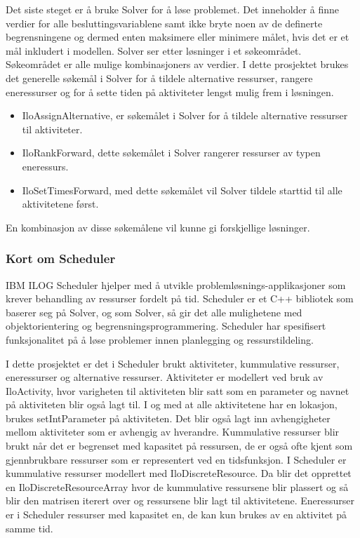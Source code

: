 Det siste steget er å bruke Solver for å løse problemet. Det inneholder å finne verdier for alle besluttingsvariablene samt ikke bryte noen av de definerte begrensningene og dermed enten maksimere eller minimere målet, hvis det er et mål inkludert i modellen. Solver ser etter løsninger i et søkeområdet. Søkeområdet er alle mulige kombinasjoners av verdier. I dette prosjektet brukes det generelle søkemål i Solver for å tildele alternative ressurser, rangere eneressurser og for å sette tiden på aktiviteter lengst mulig frem i løsningen.
\begin{itemize}
\item IloAssignAlternative, er søkemålet i Solver for å tildele alternative ressurser til aktiviteter.
\item IloRankForward, dette søkemålet i Solver rangerer ressurser av typen eneressurs.
\item IloSetTimesForward, med dette søkemålet vil Solver tildele starttid til alle aktivitetene først.
\end{itemize}
En kombinasjon av disse søkemålene vil kunne gi forskjellige løsninger.\cite{cpsolverilog}

\subsubsection{Kort om Scheduler}\cite{cpschedulerilog}
IBM ILOG Scheduler hjelper med å utvikle problemløsnings-applikasjoner som krever behandling av ressurser fordelt på tid. Scheduler er et C++ bibliotek som baserer seg på Solver, og som Solver, så gir det alle mulighetene med objektorientering og begrensningsprogrammering. Scheduler har spesifisert funksjonalitet på å løse problemer innen planlegging og ressurstildeling.

I dette prosjektet er det i Scheduler brukt aktiviteter, kummulative ressurser, eneressurser og alternative ressurser. Aktiviteter er modellert ved bruk av IloActivity, hvor varigheten til aktiviteten blir satt som en parameter og navnet på aktiviteten blir også lagt til. I og med at alle aktivitetene har en lokasjon, brukes setIntParameter på aktiviteten. Det blir også lagt inn avhengigheter mellom aktiviteter som er avhengig av hverandre. Kummulative ressurser blir brukt når det er begrenset med kapasitet på ressursen, de er også ofte kjent som gjennbrukbare ressurser som er representert ved en tidsfunksjon. I Scheduler er kummulative ressurser modellert med IloDiscreteResource. Da blir det opprettet en IloDiscreteResourceArray hvor de kummulative ressursene blir plassert og så blir den matrisen iterert over og ressursene blir lagt til aktivitetene. Eneressurser er i Scheduler ressurser med kapasitet en, de kan kun brukes av en aktivitet på samme tid.